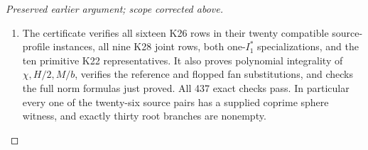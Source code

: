 \begin{proof}[Preserved earlier argument; scope corrected above]
\begin{enumerate}[label=\arabic*.]
\item The certificate verifies all sixteen K26 rows in
their twenty compatible source-profile instances,
all nine K28 joint rows, both one-\(I_1^*\)
specializations, and the ten primitive K22
representatives. It also proves polynomial
integrality of \(\chi,H/2,M/b\), verifies
the reference and flopped fan substitutions, and
checks the full norm formulas just proved.
All 437 exact checks pass. In particular every
one of the twenty-six source pairs has a supplied
coprime sphere witness, and exactly thirty
root branches are nonempty.

\end{enumerate}
\end{proof}